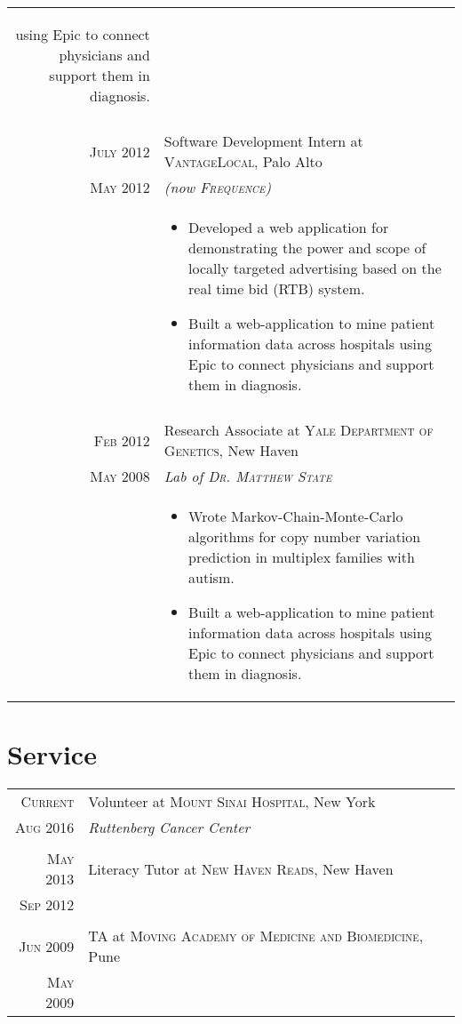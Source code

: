 \documentclass[a4paper,10pt]{article}
\begin{document}
\begin{longtable}{r|p{11cm}}
{\begin{itemize}
{			using Epic to connect physicians and support them in diagnosis.
		}
	\end{itemize}
   }\\
 \multicolumn{2}{c}{} \\
 \nopagebreak \textsc{July 2012} & Software Development Intern at \textsc{VantageLocal}, Palo Alto \\		
 \nopagebreak \textsc{May 2012} & \small\emph{(now \textsc{Frequence})} \\
 \nopagebreak & \footnotesize{
	\begin{itemize}
		\item[]{
			Developed a web application for demonstrating the power and scope of
			locally targeted advertising based on the real time bid (RTB) system.
		}
		\item[]{
			Built a web-application to mine patient information data across hospitals
			using Epic to connect physicians and support them in diagnosis.
		}
	\end{itemize}
   }\\
 \multicolumn{2}{c}{} \\
 \nopagebreak \textsc{Feb 2012} & Research Associate at \textsc{Yale Department of Genetics}, New Haven \\
 \nopagebreak \textsc{May 2008} & \small\emph{Lab of \textsc{Dr. Matthew State}} \\
 \nopagebreak & \footnotesize{
	\begin{itemize}
		\item[]{
			Wrote Markov-Chain-Monte-Carlo algorithms for copy number variation prediction
			in multiplex families with autism.
		}
		\item[]{
			Built a web-application to mine patient information data across hospitals
			using Epic to connect physicians and support them in diagnosis.
		}
	\end{itemize}
   }\\
\end{longtable}

\section{Service}
\begin{longtable}{r|p{11cm}}
 \nopagebreak \textsc{Current} & Volunteer at \textsc{Mount Sinai Hospital}, New York \\
 \nopagebreak \textsc{Aug 2016} & \small\emph{Ruttenberg Cancer Center} \\
 \multicolumn{2}{c}{} \\
 \nopagebreak \textsc{May 2013} & Literacy Tutor at \textsc{New Haven Reads}, New Haven \\
 \nopagebreak \textsc{Sep 2012} & \\
 \multicolumn{2}{c}{} \\
 \nopagebreak \textsc{Jun 2009} & TA at \textsc{Moving Academy of Medicine and Biomedicine}, Pune \\
 \nopagebreak \textsc{May 2009} & \\
\end{longtable}
\end{document}
